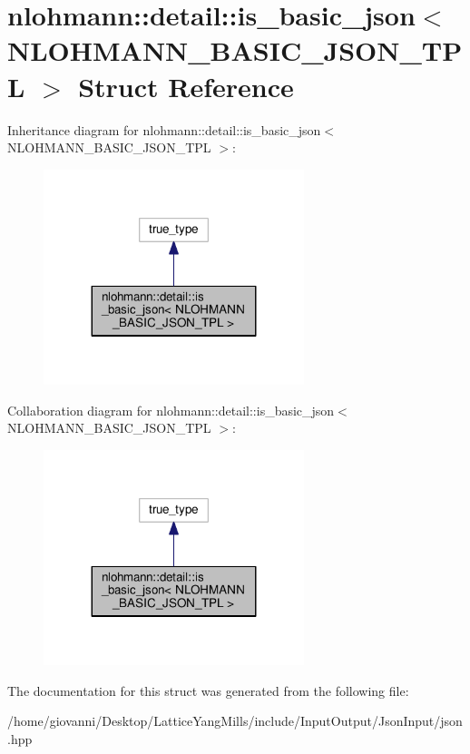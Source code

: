 \hypertarget{structnlohmann_1_1detail_1_1is__basic__json_3_01NLOHMANN__BASIC__JSON__TPL_01_4}{}\section{nlohmann\+:\+:detail\+:\+:is\+\_\+basic\+\_\+json$<$ N\+L\+O\+H\+M\+A\+N\+N\+\_\+\+B\+A\+S\+I\+C\+\_\+\+J\+S\+O\+N\+\_\+\+T\+PL $>$ Struct Reference}
\label{structnlohmann_1_1detail_1_1is__basic__json_3_01NLOHMANN__BASIC__JSON__TPL_01_4}


Inheritance diagram for nlohmann\+:\+:detail\+:\+:is\+\_\+basic\+\_\+json$<$ N\+L\+O\+H\+M\+A\+N\+N\+\_\+\+B\+A\+S\+I\+C\+\_\+\+J\+S\+O\+N\+\_\+\+T\+PL $>$\+:\nopagebreak
\begin{figure}[H]
\begin{center}
\leavevmode
\includegraphics[width=215pt]{structnlohmann_1_1detail_1_1is__basic__json_3_01NLOHMANN__BASIC__JSON__TPL_01_4__inherit__graph}
\end{center}
\end{figure}


Collaboration diagram for nlohmann\+:\+:detail\+:\+:is\+\_\+basic\+\_\+json$<$ N\+L\+O\+H\+M\+A\+N\+N\+\_\+\+B\+A\+S\+I\+C\+\_\+\+J\+S\+O\+N\+\_\+\+T\+PL $>$\+:\nopagebreak
\begin{figure}[H]
\begin{center}
\leavevmode
\includegraphics[width=215pt]{structnlohmann_1_1detail_1_1is__basic__json_3_01NLOHMANN__BASIC__JSON__TPL_01_4__coll__graph}
\end{center}
\end{figure}


The documentation for this struct was generated from the following file\+:\begin{DoxyCompactItemize}
\item 
/home/giovanni/\+Desktop/\+Lattice\+Yang\+Mills/include/\+Input\+Output/\+Json\+Input/json.\+hpp\end{DoxyCompactItemize}
